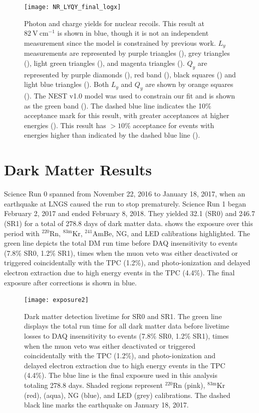 \begin{figure}
\centering
\texttt{[image: NR\_LYQY\_final\_logx]}
\caption{Photon and charge yields for nuclear recoils.  This result at $82\ \mathrm{V\ cm^{-1}}$ is shown in blue, though it is not
an independent measurement since the model is constrained by previous work.  $L_y$ measurements are represented by purple triangles
(), grey triangles (), light green triangles (), and magenta triangles
().  $Q_y$ are represented by purple diamonds (), red band (), black squares
() and light blue triangles ().  Both $L_y$ and $Q_y$ are shown by orange squares
().  The NEST v1.0 model was used to constrain our fit and is shown as the green band ().  The dashed
blue line indicates the 10\% acceptance mark for this result, with greater acceptances at higher
energies ().  This result has $> 10\%$ acceptance for events with energies higher than
indicated by the dashed blue line ().}
\label{fig:er_nr_calibrations_results_ly_qy_nr}
\end{figure}



\section{Dark Matter Results}
\label{sec:dark_matter_results}
Science Run 0 spanned from November 22, 2016 to January 18, 2017, when an earthquake at LNGS caused the run to stop prematurely.  Science
Run 1 began February 2, 2017 and ended February 8, 2018.  They
yielded 32.1 (SR0) and 246.7 (SR1) for a total of 278.8 days of dark matter data.   shows the
exposure over this period with $^{220}$Rn, $^{83\mathrm{m}}$Kr, $^{241}$AmBe, NG, and LED calibrations highlighted.  The green line
depicts the total DM run time before DAQ insensitivity to events (7.8\% SR0, 1.2\% SR1), times when the muon veto was either
deactivated or triggered coincidentally with the TPC (1.2\%), and photo-ionization and delayed electron extraction due to high energy
events in the TPC (4.4\%).  The final exposure after corrections is shown in blue.

\begin{figure}
\centering
\texttt{[image: exposure2]}
\caption{Dark matter detection livetime for SR0 and SR1.  The green line displays the total run time for all dark matter data before
livetime losses to DAQ insensitivity to events (7.8\% SR0, 1.2\% SR1), times when the muon veto was either
deactivated or triggered coincidentally with the TPC (1.2\%), and photo-ionization and delayed electron extraction due to high energy
events in the TPC (4.4\%).  The blue line is the final exposure used in this analysis totaling 278.8 days.  Shaded regions represent
$^{220}$Rn (pink), $^{83\mathrm{m}}$Kr (red), \ambe (aqua), NG (blue), and LED (grey) calibrations.  The dashed black line marks the
earthquake on January 18, 2017.}
\label{fig:dark_matter_results_exposure}
\end{figure}

